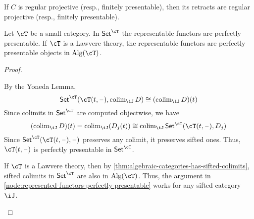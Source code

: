 \documentclass{zett}
\begin{document}
\begin{cor}
  If $C$ is regular projective (resp., finitely presentable), then its retracts are regular projective (resp., finitely presentable).
\end{cor}

\begin{thm}\label{thm:represented-functors-perfectly-presentable}
  Let $\cT$ be a small category.
  In $\CSet^{\cT}$ the representable functors are perfectly presentable.
  If $\cT$ is a Lawvere theory, the representable functors are perfectly presentable objects in $\Alg(\cT)$.
\end{thm}
\begin{proof}
  \begin{node}\label{node:represented-functors-perfectly-presentable}
    By the Yoneda Lemma,
    \[
      \CSet^{\cT}(\cT(t,\blank), \colim_{\iJ} D) \iso (\colim_{\iJ} D)(t)
    \]
    Since colimits in $\CSet^{\cT}$ are computed objectwise, we have
    \[
      (\colim_{\iJ} D)(t) = \colim_{\iJ}(D_{j}(t)) \iso \colim_{\iJ}\CSet^{\cT}(\cT(t,\blank), D_{j})
    \]
    Since $\CSet^{\cT}(\cT(t,\blank), \blank)$ preserves any colimit, it preserves sifted ones.
    Thus, $\cT(t,\blank)$ is perfectly presentable in $\CSet^{\cT}$.
  \end{node}
  \begin{node}
    If $\cT$ is a Lawvere theory, then by \cref{thm:algebraic-categories-has-sifted-colimits}, sifted colimits in $\CSet^{\cT}$ are also in $\Alg(\cT)$.
    Thus, the argument in \cref{node:represented-functors-perfectly-presentable} works for any sifted category $\iJ$.
  \end{node}
\end{proof}
\end{document}
